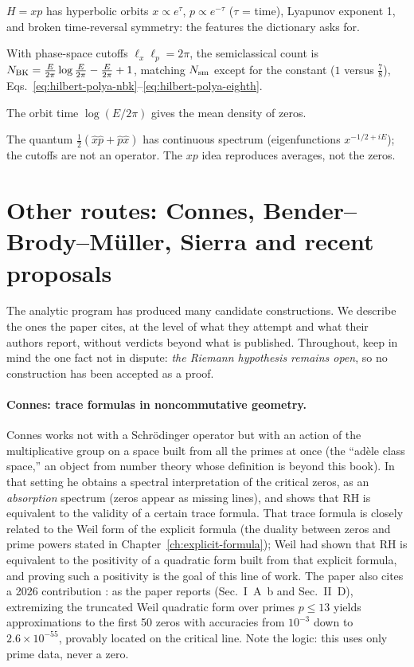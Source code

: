 \begin{keyideas}
\item $H=xp$ has hyperbolic orbits $x\propto e^\tau$, $p\propto e^{-\tau}$ ($\tau$ = time), Lyapunov exponent 1, and broken time-reversal symmetry: the features the dictionary asks for.
\item With phase-space cutoffs $\ell_x\ell_p=2\pi$, the semiclassical count is $N_{\rm BK}=\frac{E}{2\pi}\log\frac{E}{2\pi}-\frac E{2\pi}+1$, matching $N_{\mathrm{sm}}$ except for the constant ($1$ versus $\tfrac78$), Eqs.~\eqref{eq:hilbert-polya-nbk}--\eqref{eq:hilbert-polya-eighth}.
\item The orbit time $\log(E/2\pi)$ gives the mean density of zeros.
\item The quantum $\tfrac12(\hat x\hat p+\hat p\hat x)$ has continuous spectrum (eigenfunctions $x^{-1/2+iE}$); the cutoffs are not an operator. The $xp$ idea reproduces averages, not the zeros.
\end{keyideas}

\section{Other routes: Connes, Bender--Brody--M\"uller, Sierra and recent proposals}\label{sec:hilbert-polya-proposals}

The analytic program has produced many candidate constructions. We describe the ones the paper cites, at the level of what they attempt and what their authors report, without verdicts beyond what is published. Throughout, keep in mind the one fact not in dispute: \emph{the Riemann hypothesis remains open}, so no construction has been accepted as a proof.

\paragraph{Connes: trace formulas in noncommutative geometry.} Connes \cite{connes} works not with a Schr\"odinger operator but with an action of the multiplicative group on a space built from all the primes at once (the ``ad\`ele class space,'' an object from number theory whose definition is beyond this book). In that setting he obtains a spectral interpretation of the critical zeros, as an \emph{absorption} spectrum (zeros appear as missing lines), and shows that RH is equivalent to the validity of a certain trace formula. That trace formula is closely related to the Weil form of the explicit formula (the duality between zeros and prime powers stated in Chapter~\ref{ch:explicit-formula}); Weil had shown that RH is equivalent to the positivity of a quadratic form built from that explicit formula, and proving such a positivity is the goal of this line of work. The paper also cites a 2026 contribution \cite{connes26}: as the paper reports (Sec.~I~A~b and Sec.~II~D), extremizing the truncated Weil quadratic form over primes $p\le13$ yields approximations to the first 50 zeros with accuracies from $10^{-3}$ down to $2.6\times10^{-55}$, provably located on the critical line. Note the logic: this uses only prime data, never a zero.

